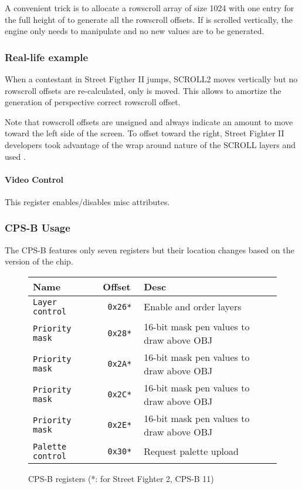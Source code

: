 A convenient trick is to allocate a rowscroll array of size 1024 with one entry for the full height of  to generate all the rowscroll offsets. If  is scrolled vertically, the engine only needs to manipulate  and no new values are to be generated.

 

\subsubsection{Real-life example}

When a contestant in Street Figther II jumps, SCROLL2 moves vertically but no rowscroll offsets are re-calculated, only   is moved. This allows to amortize the generation of perspective correct rowscroll offset.

Note that rowscroll offsets are unsigned and always indicate an amount to move toward the left side of the screen. To offset toward the right, Street Fighter II developers took advantage of the wrap around nature of the SCROLL layers and used .

\paragraph{Video Control} This register enables/disables misc attributes.

 

\label{cpsbreg_programming}
\subsubsection{CPS-B Usage}
The CPS-B features only seven registers but their location changes based on the version of the chip.

 \begin{figure}[H]
\begin{tabularx}{\textwidth}{llX}
  \toprule    
  \textbf{Name } & \textbf{ Offset }  & \textbf{Desc }\\  
  \toprule   
  \texttt{Layer control} & \texttt{ 0x26* } & Enable and order layers\\      
\texttt{Priority mask} & \texttt{ 0x28* } &  16-bit mask pen values to draw above OBJ   \\  
\texttt{Priority mask} & \texttt{ 0x2A* } &  16-bit mask pen values to draw above OBJ   \\  
\texttt{Priority mask} & \texttt{ 0x2C* } &  16-bit mask pen values to draw above OBJ   \\  
\texttt{Priority mask} & \texttt{ 0x2E* } &  16-bit mask pen values to draw above OBJ  \\  
\texttt{Palette control} & \texttt{ 0x30* } &  Request palette upload\\ 
  \toprule   
\end{tabularx}
\caption*{CPS-B registers (*: for Street Fighter 2, CPS-B 11)}
\end{figure}

